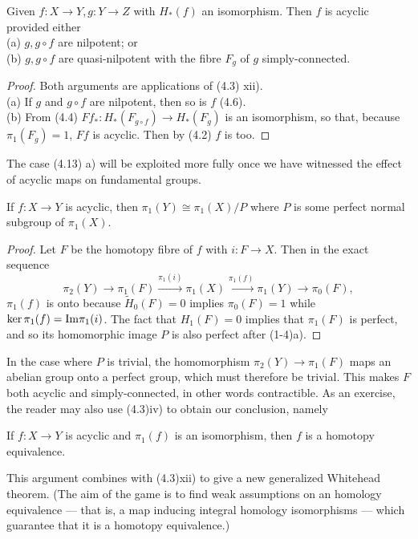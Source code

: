 \begin{prop}
  Given $f\colon  X\longrightarrow Y, g\colon   Y\longrightarrow Z$ with $H_*(f)$ an isomorphism. Then $f$ is acyclic provided either\\
(a) $g, g\circ f$ are nilpotent; or\\
(b) $g, g\circ f$ are quasi-nilpotent with the fibre $F_g$ of $g$ simply-connected.
\end{prop}
\begin{proof}
Both arguments are applications of (4.3) xii). \\
(a) If $g$ and $g\circ f$ are nilpotent, then so is $f$ (4.6). \\
(b) From (4.4) $Ff_* \colon   H_*(F_{g\circ f})\longrightarrow H_*(F_g)$ is an isomorphism, so that, because $\pi_1 (F_g) = 1$, $Ff$ is acyclic. Then by (4.2) $f$ is too.
\end{proof}
The case (4.13) a) will be exploited more fully once we have witnessed the effect of acyclic maps on fundamental groups.
\begin{prop}
  If $f\colon  X\longrightarrow Y$ is acyclic, then $\pi_1(Y) \cong \pi_1(X)/P$ where $P$ is some perfect normal subgroup of $\pi_1(X)$.
 \end{prop} 
\begin{proof}
Let $F$ be the homotopy fibre of $f$ with $i\colon  F\longrightarrow X$. Then in the exact sequence
\[\pi_2(Y)\longrightarrow \pi_1(F)\overset{\pi_1(i)}\longrightarrow \pi_1(X) \overset{\pi_1(f)}\longrightarrow \pi_1(Y)\longrightarrow \pi_0(F),\]
 $\pi_1(f)$ is onto because $\widetilde{H}_0(F) = 0$ implies $\pi_0(F) = 1$ while $\ker\pi_1(f) = \mathrm{Im} \pi_1(i)$. The fact that
$H_1(F) =0$ implies that $\pi_1(F)$ is perfect, and so its homomorphic image $P$ is also perfect after (1-4)a).
\end{proof}

In the case where $P$ is trivial, the homomorphism $\pi_2(Y)\longrightarrow \pi_1(F)$ maps an abelian group onto a perfect group, which must therefore be trivial. This makes $F$ both acyclic and simply-connected, in other words contractible. As an exercise, the reader may also use (4.3)iv) to obtain our conclusion, namely
\begin{prop}
  If $f\colon  X\longrightarrow Y$ is acyclic and $\pi_1(f)$ is an isomorphism, then $f$ is a homotopy equivalence.
 \end{prop} 

This argument combines with (4.3)xii) to give a new generalized Whitehead theorem. (The aim of the game is to find weak assumptions on an homology equivalence --- that is, a map inducing integral homology isomorphisms --- which guarantee that it is a homotopy equivalence.)

